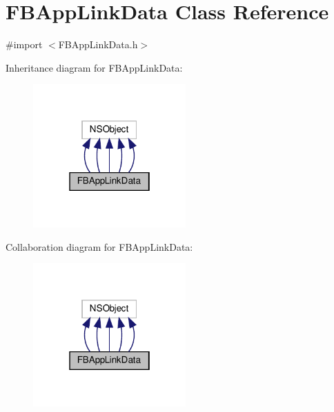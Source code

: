 \hypertarget{interfaceFBAppLinkData}{}\section{F\+B\+App\+Link\+Data Class Reference}
\label{interfaceFBAppLinkData}


{\ttfamily \#import $<$F\+B\+App\+Link\+Data.\+h$>$}



Inheritance diagram for F\+B\+App\+Link\+Data\+:
\nopagebreak
\begin{figure}[H]
\begin{center}
\leavevmode
\includegraphics[width=166pt]{interfaceFBAppLinkData__inherit__graph}
\end{center}
\end{figure}


Collaboration diagram for F\+B\+App\+Link\+Data\+:
\nopagebreak
\begin{figure}[H]
\begin{center}
\leavevmode
\includegraphics[width=166pt]{interfaceFBAppLinkData__coll__graph}
\end{center}
\end{figure}

